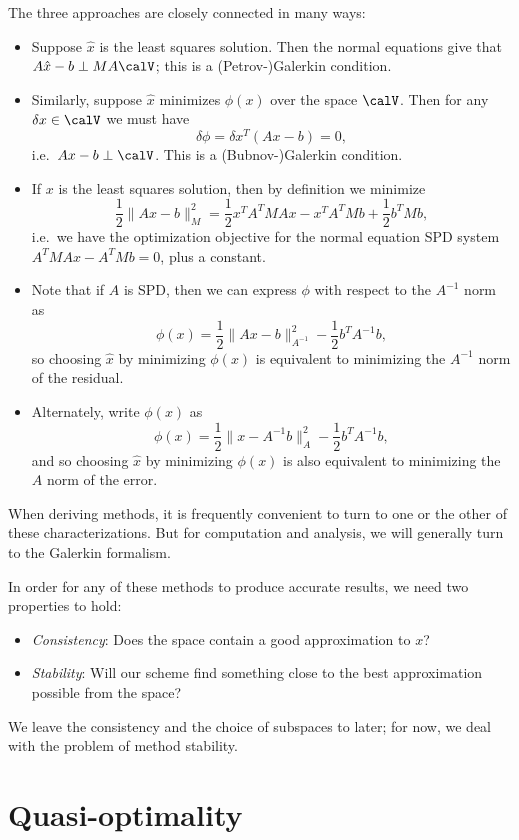 \documentclass[12pt, leqno]{article} %
\begin{document}
The three approaches are closely connected in many ways:
\begin{itemize}
\item
  Suppose $\hat{x}$ is the least squares solution.  Then the normal
  equations give that $A\hat{x}-b \perp M A\calV$; this is a
  (Petrov-)Galerkin condition.
\item
  Similarly, suppose $\hat{x}$ minimizes $\phi(x)$ over the space
  $\calV$.  Then for any $\delta x \in \calV$ we must have
  \[
    \delta \phi = \delta x^T (Ax-b) = 0,
  \]
  i.e.~$Ax-b \perp \calV$.  This is a (Bubnov-)Galerkin condition.
\item
  If $x$ is the least squares solution, then by definition
  we minimize
  \[
    \frac{1}{2} \|Ax-b\|_M^2 = \frac{1}{2} x^T A^T M A x - x^T A^T M b + \frac{1}{2} b^T M b,
  \]
  i.e.~we have the optimization objective for the normal equation
  SPD system $A^T M A x - A^T M b = 0$, plus a constant.
\item
  Note that if $A$ is SPD, then we can express $\phi$ with respect to
  the $A^{-1}$ norm as
  \[
    \phi(x) = \frac{1}{2} \|Ax-b\|_{A^{-1}}^2 - \frac{1}{2} b^T A^{-1} b,
  \]
  so choosing $\hat{x}$ by minimizing $\phi(x)$ is equivalent to
  minimizing the $A^{-1}$ norm of the residual.
\item
  Alternately, write $\phi(x)$ as
  \[
    \phi(x) = \frac{1}{2} \|x-A^{-1} b\|_A^2 - \frac{1}{2} b^T A^{-1} b,
  \]
  and so choosing $\hat{x}$ by minimizing $\phi(x)$ is also
  equivalent to minimizing the $A$ norm of the error.
\end{itemize}
When deriving methods, it is frequently convenient to turn to one or
the other of these characterizations.  But for computation and analysis,
we will generally turn to the Galerkin formalism.

In order for any of these methods to produce accurate results, we need
two properties to hold:
\begin{itemize}
\item {\em Consistency}: Does the space contain a good approximation to $x$?
\item {\em Stability}: Will our scheme find something close to the best
  approximation possible from the space?
\end{itemize}
We leave the consistency and the choice of subspaces to later; for now,
we deal with the problem of method stability.

\section{Quasi-optimality}
\end{document}

